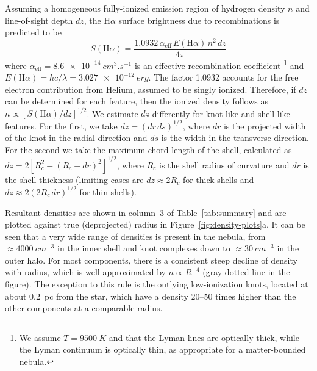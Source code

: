 \documentclass[useAMS, usenatbib]{mnras}
\newcommand\Ha{\ensuremath{\mathrm{H}\alpha}}
\begin{document}
Assuming a homogeneous fully-ionized emission region of hydrogen density \(n\) and line-of-sight depth \(dz\), the \Ha{} surface brightness due to recombinations is predicted to be 
\begin{equation}
  \label{eq:sha-density}
  S(\Ha) = \frac{1.0932\, \alpha_{\text{eff}}\, E(\Ha) \, n^2 \, dz} {4\pi}
\end{equation}
where \(\alpha_{\text{eff}} = \SI{8.6e-14}{cm^{3}.s^{-1}}\) is an effective recombination coefficient \citep{Osterbrock:2006a}%
\footnote{We assume \(T = \SI{9500}{K}\) and that the Lyman lines are optically thick, while the Lyman continuum is optically thin, as appropriate for a matter-bounded nebula.}
and \(E(\Ha) = h c / \lambda = \SI{3.027e-12}{erg}\).
The factor \num{1.0932} accounts for the free electron contribution from Helium, assumed to be singly ionized.
Therefore, if \(dz\) can be determined for each feature, then the ionized density follows as \(n \propto [S(\Ha) / dz]^{1/2}\).
We estimate \(dz\) differently for knot-like and shell-like features.
For the first, we take \(dz = (dr\, ds)^{1/2}\), where \(dr\) is the projected width of the knot in the radial direction and \(ds\) is the width in the transverse direction.
For the second we take the maximum chord length of the shell, calculated as \(dz = 2 [R_c^2 - (R_c - dr)^2]^{1/2}\), where \(R_c\) is the shell radius of curvature and \(dr\) is the shell thickness
(limiting cases are \(dz \approx 2 R_c\) for thick shells and \(dz \approx 2 (2 R_c\, dr)^{1/2}\) for thin shells).

Resultant densities are shown in column~3 of Table~\ref{tab:summary} and are plotted against true (deprojected) radius in Figure~\ref{fig:density-plots}a.
It can be seen that a very wide range of densities is present in the nebula, from \(\approx \SI{4000}{cm^{-3}}\) in the inner shell and knot complexes down to \(\approx \SI{30}{cm^{-3}}\) in the outer halo.
For most components, there is a consistent steep decline of density with radius,
which is well approximated by \(n \propto R^{-4}\) (gray dotted line in the figure).
The exception to this rule is the outlying low-ionization knots,
located at about \SI{0.2}{pc} from the star, which have a density 20--50 times higher than the other components at a comparable radius.
\end{document}

